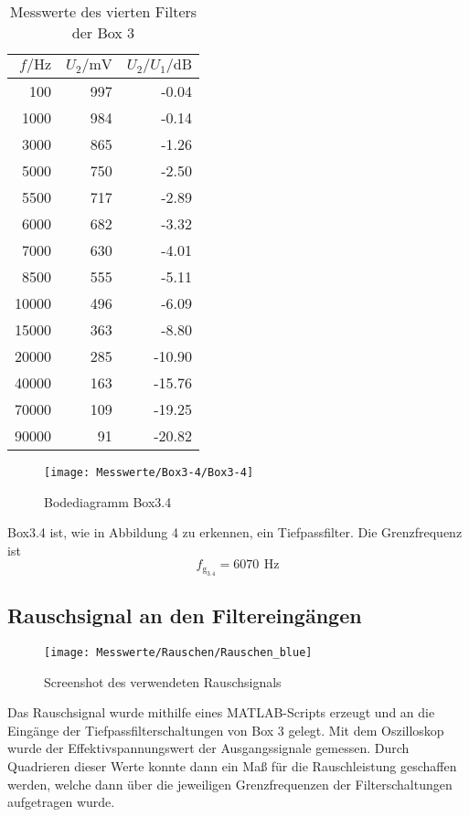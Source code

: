 \documentclass[a4paper, 12pt]{article}
\begin{document}
\begin{table}[H]
  \begin{center}
    \begin{tabular}{@{}rrr@{}}
      \toprule
      $f / \si{\hertz}$ & $U_2 / \si{\milli\volt}$ & $U_2/U_1 / \si{\deci\bel}$ \\ \midrule
      100   & 997 & -0.04\\
      1000  & 984 & -0.14\\
      3000  & 865 & -1.26\\
      5000  & 750 & -2.50\\
      5500  & 717 & -2.89\\
      6000  & 682 & -3.32\\
      7000  & 630 & -4.01\\
      8500  & 555 & -5.11\\
      10000 & 496 & -6.09\\
      15000 & 363 & -8.80\\
      20000 & 285 & -10.90\\
      40000 & 163 & -15.76\\
      70000 & 109 & -19.25\\
      90000 & 91  & -20.82\\ \bottomrule
    \end{tabular}
  \end{center}
  \caption{Messwerte des vierten Filters der Box 3}
\end{table}

\begin{figure}[H]
	\texttt{[image: Messwerte/Box3-4/Box3-4]}
  \caption{Bodediagramm Box3.4}
\end{figure}

Box3.4 ist, wie in Abbildung 4 zu erkennen, ein Tiefpassfilter.
Die Grenzfrequenz ist
$$f_{\textrm{g}_{3.4}} =  6070 \,\ \si{\hertz}$$


\subsection{Rauschsignal an den Filtereingängen}

\begin{figure}[H]
	\texttt{[image: Messwerte/Rauschen/Rauschen\_blue]}
  \caption{Screenshot des verwendeten Rauschsignals}
\end{figure}

Das Rauschsignal wurde mithilfe eines MATLAB-Scripts erzeugt und an die Eingänge
der Tiefpassfilterschaltungen von Box 3 gelegt. Mit dem Oszilloskop wurde der
Effektivspannungswert der Ausgangssignale gemessen. Durch Quadrieren dieser
Werte konnte dann ein Maß für die Rauschleistung geschaffen werden, welche dann
über die jeweiligen Grenzfrequenzen der Filterschaltungen aufgetragen wurde.
\end{document}
